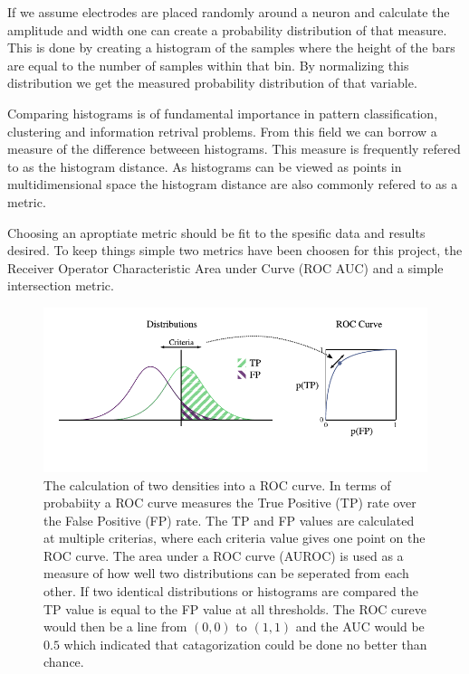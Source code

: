 \documentclass[altfont, fleqn]{uiophd}
\begin{document}
If we assume electrodes are placed randomly around a neuron and calculate
the amplitude and width one can create a probability distribution
of that measure. 
This is done by creating a histogram of the samples 
where the height of the bars are equal to the number of samples within 
that bin. 
By normalizing this distribution we get the measured probability distribution
of that variable. 

Comparing histograms is of fundamental importance in pattern classification, 
clustering and information retrival problems. 
From this field we can borrow a
measure of the difference betweeen histograms. 
This measure is frequently refered to as the histogram distance. 
As histograms can be viewed as points in multidimensional space 
the histogram distance are also commonly refered to as a metric. 

Choosing an aproptiate metric should be fit to the spesific data and results
desired. 
To keep things simple two metrics have been choosen for this project, 
the Receiver Operator Characteristic Area under Curve
(ROC AUC) and a simple intersection metric. 
\newline
\begin{figure}[h]
    \begin{center}
        \includegraphics[width=\textwidth]{images/sec_3/roc_curve.pdf}
        \caption{
            The calculation of two densities into a ROC curve. 
            In terms of probabiity 
            a ROC curve measures the True Positive (TP) rate over the
            False Positive (FP) rate. 
            The TP and FP values are calculated at multiple criterias, 
            where each criteria value gives one point on the ROC curve. 
            The area under a ROC curve (AUROC) is used as a measure of how well
            two distributions can be seperated from each other. 
            If two identical distributions or histograms are compared
            the TP value is equal to the FP value at all thresholds. 
            The ROC cureve would then be a line from $(0,0)$
            to $(1,1)$ and the AUC would be $0.5$ which indicated that
            catagorization could be done no better than chance.
        }
        \label{fig:3_roc_auc}
    \end{center}
\end{figure}
\end{document}
